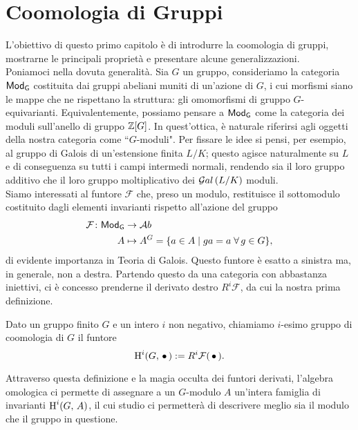 \chapter{Coomologia di Gruppi}


L'obiettivo di questo primo capitolo è di introdurre la coomologia di gruppi, mostrarne le principali proprietà e presentare alcune generalizzazioni.\\

Poniamoci nella dovuta generalità. Sia $ G $ un gruppo, consideriamo la categoria $ \mathsf{Mod}_\mathsf{G} $ costituita dai gruppi abeliani muniti di un'azione di $ G $, i cui morfismi siano le mappe che ne rispettano la struttura: gli omomorfismi di gruppo $ G $-equivarianti. Equivalentemente, possiamo pensare a $ \mathsf{Mod}_\mathsf{G} $ come la categoria dei moduli sull'anello di gruppo $ \mathbb{Z}[G] $. In quest'ottica, è naturale riferirsi agli oggetti della nostra categoria come \textquotedblleft$ G $-moduli".
Per fissare le idee si pensi, per esempio, al gruppo di Galois di un'estensione finita $ L/K $; questo agisce naturalmente su $ L $ e di conseguenza su tutti i campi intermedi normali, rendendo sia il loro gruppo additivo che il loro gruppo moltiplicativo dei $ \mathcal{G}al\left( L/K \right) $ moduli. \\

Siamo interessati al funtore $ \mathcal{F} $ che, preso un modulo, restituisce il sottomodulo costituito dagli elementi invarianti rispetto all'azione del gruppo
\begin{align*} 
\mathcal{F} \colon \mathsf{Mod}_\mathsf{G} &\to \mathcal{A}b \\
A &\mapsto A^G = \{ a \in A \mid ga = a \; \forall \, g \in G \},
\end{align*}
di evidente importanza in Teoria di Galois. Questo funtore è esatto a sinistra ma, in generale, non a destra. Partendo questo da una categoria con abbastanza iniettivi, ci è concesso prenderne il derivato destro $ R^i\mathcal{F} $, da cui la nostra prima definizione.

\begin{definition}
	Dato un gruppo finito $ G $ e un intero $ i $ non negativo, chiamiamo $ i $-esimo gruppo di coomologia di $ G $ il funtore
	\[ \operatorname{H}^i(G, \, \bullet\,) : = R^i\mathcal{F}(\,\bullet\,). \]
\end{definition}

Attraverso questa definizione e la magia occulta dei funtori derivati, l'algebra omologica ci permette di assegnare a un $ G $-modulo $ A $ un'intera famiglia di invarianti $ \operatorname{H}^i(G, \, A) $, il cui studio ci permetterà di descrivere meglio sia il modulo che il gruppo in questione. 

